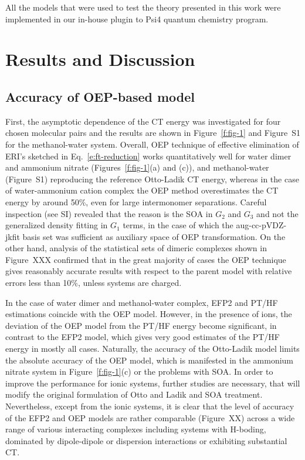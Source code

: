 All the models that were used to test the theory presented in this work
were implemented in our in\hyp{}house plugin to {\sc Psi4} quantum chemistry program.\cite{Psi4.JCTC.2017}

\section{\label{s:fwefsdv}Results and Discussion}

\subsection{\label{s:gsdzdv}Accuracy of OEP-based model}

First, the asymptotic dependence of the CT energy
was investigated for four chosen molecular pairs and the results are
shown in Figure~\ref{f:fig-1} and Figure~S1 for the methanol-water system. 
Overall, OEP technique of effective
elimination of ERI's sketched in Eq.~\eqref{e:ft-reduction} 
works
quantitatively well for water dimer and ammonium nitrate (Figures~\ref{f:fig-1}(a) and (c)),
and methanol-water (Figure~S1)
reproducing the reference Otto\hyp{}Ladik CT energy,
whereas in the case of water\hyp{}ammonium cation complex the OEP
method overestimates the CT energy by around 50\%, even for large
intermonomer separations. Careful inspection
(see SI)
revealed that the reason is the SOA in $G_2$ and $G_3$ and not
the generalized density fitting in $G_1$ terms, in the case of which
the aug-cc-pVDZ-jkfit basis set was sufficient as auxiliary space of OEP transformation.
On the other hand, analysis of the statistical sets of dimeric complexes
shown in Figure~XXX
confirmed that in the great majority of cases the 
OEP technique gives reasonably accurate results with respect
to the parent model with relative errors less than 10\%,
unless systems are charged.

In the case of water dimer and methanol-water complex, EFP2 and PT/HF estimations
coincide with the OEP model. However, in the presence of ions, 
the deviation of the OEP model from the PT/HF energy 
become significant, in contrast to the EFP2 model, which gives very good estimates
of the PT/HF energy in mostly all cases.
Naturally, the accuracy of the Otto\hyp{}Ladik model limits the absolute accuracy
of the OEP model, which is manifested in the ammonium nitrate system
in Figure~\ref{f:fig-1}(c) or the problems with SOA. 
In order to improve the performance for ionic systems,
further studies are necessary, that will modify the original formulation
of Otto and Ladik and SOA treatment. Nevertheless, except from the ionic systems,
it is clear that the level of accuracy of the EFP2 and OEP models are rather comparable
(Figure~XX) across a wide range of various interacting complexes including 
systems with H-boding, dominated by dipole-dipole or dispersion interactions or 
exhibiting substantial CT.


